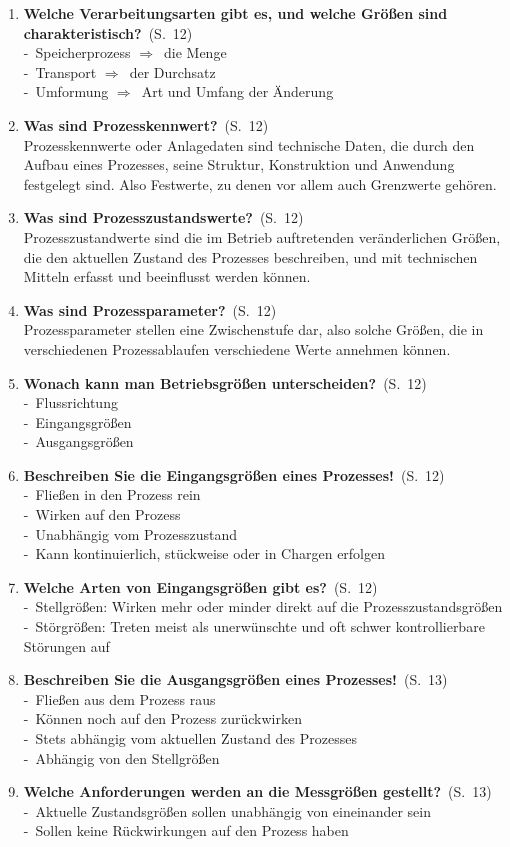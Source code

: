 \documentclass[a4paper,12pt]{article}
\newcommand{\question}[3]{\pagebreak[3]\item {\textbf{#1?}}\ (S.\ #2)#3}
\newcommand{\statement}[3]{\pagebreak[3]\item {\textbf{#1!}}\ (S.\ #2)#3}
\newcommand{\catchword}[1]{\\-\ #1}
\newcommand{\normaltext}[1]{\\#1}
\newcommand{\resultol}[1]{$\Rightarrow$\ #1}
\newcommand{\page}[1]{#1}
\begin{document}
\begin{enumerate}
  \question{Welche Verarbeitungsarten gibt es, und welche Größen sind charakteristisch}{\page{12}}
  {
    \catchword{Speicherprozess \resultol{die Menge}}
    \catchword{Transport \resultol{der Durchsatz}}
    \catchword{Umformung \resultol{Art und Umfang der Änderung}}
  }

  \question{Was sind Prozesskennwert}{\page{12}}
  {
    \normaltext{Prozesskennwerte oder Anlagedaten sind technische Daten, die durch den Aufbau eines
                Prozesses, seine Struktur, Konstruktion und Anwendung festgelegt sind. Also Festwerte,
                zu denen vor allem auch Grenzwerte gehören.}
  }

  \question{Was sind Prozesszustandswerte}{\page{12}}
  {
    \normaltext{Prozesszustandwerte sind die im Betrieb auftretenden veränderlichen Größen, die den
                aktuellen Zustand des Prozesses beschreiben, und mit technischen Mitteln erfasst
                und beeinflusst werden können.}
  }

  \question{Was sind Prozessparameter}{\page{12}}
  {
    \normaltext{Prozessparameter stellen eine Zwischenstufe dar, also solche Größen, die in verschiedenen
                Prozessablaufen verschiedene Werte annehmen können.}
  }

  \question{Wonach kann man Betriebsgrößen unterscheiden}{\page{12}}
  {
    \catchword{Flussrichtung}
    \catchword{Eingangsgrößen}
    \catchword{Ausgangsgrößen}
  }

  \statement{Beschreiben Sie die Eingangsgrößen eines Prozesses}{\page{12}}
  {
    \catchword{Fließen in den Prozess rein}
    \catchword{Wirken auf den Prozess}
    \catchword{Unabhängig vom Prozesszustand}
    \catchword{Kann kontinuierlich, stückweise oder in Chargen erfolgen}
  }

  \question{Welche Arten von Eingangsgrößen gibt es}{\page{12}}
  {
    \catchword{Stellgrößen: Wirken mehr oder minder direkt auf die Prozesszustandsgrößen}
    \catchword{Störgrößen: Treten meist als unerwünschte und oft schwer kontrollierbare Störungen auf}
  }

  \statement{Beschreiben Sie die Ausgangsgrößen eines Prozesses}{\page{13}}
  {
    \catchword{Fließen aus dem Prozess raus}
    \catchword{Können noch auf den Prozess zurückwirken}
    \catchword{Stets abhängig vom aktuellen Zustand des Prozesses}
    \catchword{Abhängig von den Stellgrößen}
  }

  \question{Welche Anforderungen werden an die Messgrößen gestellt}{\page{13}}
  {
    \catchword{Aktuelle Zustandsgrößen sollen unabhängig von eineinander sein}
    \catchword{Sollen keine Rückwirkungen auf den Prozess haben}
  }


\end{enumerate}
\end{document}
